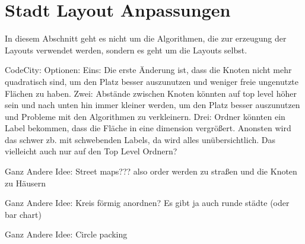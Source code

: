 \section{Stadt Layout Anpassungen} \label{sec:SquarifyLayoutAnpassungen}

In diesem Abschnitt geht es nicht um die Algorithmen, die zur erzeugung der Layouts verwendet werden, sondern es geht um die Layouts selbst. 

CodeCity:
Optionen:
Eins:
Die erste Änderung ist, dass die Knoten nicht mehr quadratisch sind, um den Platz besser auszunutzen und weniger freie ungenutzte Flächen zu haben.
Zwei:
Abstände zwischen Knoten könnten auf top level höher sein und nach unten hin immer kleiner werden, um den Platz besser auszunutzen und Probleme mit den Algorithmen zu verkleinern.
Drei:
Ordner könnten ein Label bekommen, dass die Fläche in eine dimension vergrößert. Anonsten wird das schwer zb. mit schwebenden Labels, da wird alles unübersichtlich. Das vielleicht auch nur auf den Top Level Ordnern?



Ganz Andere Idee:
Street maps???
also order werden zu straßen und die Knoten zu Häusern



Ganz Andere Idee:
Kreis förmig anordnen? Es gibt ja auch runde städte
(oder bar chart)




Ganz Andere Idee:
Circle packing

